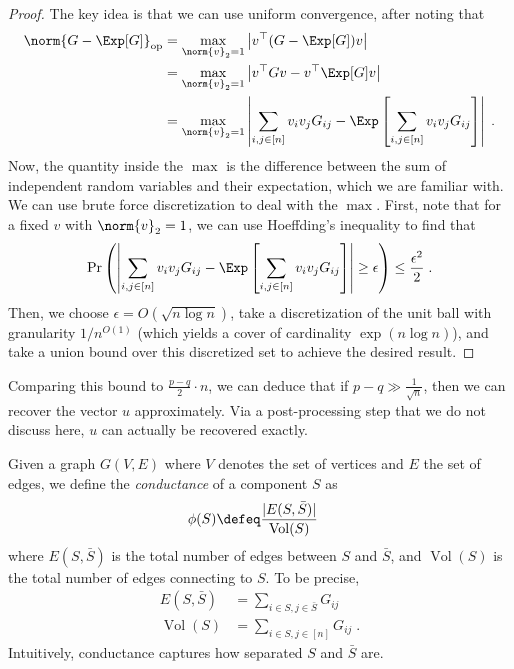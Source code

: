 \begin{proof}
The key idea is that we can use uniform convergence, after noting that
\begin{align}
    \norm{ G - \Exp[G] }_{\mathrm{op}} &= \max_{\norm{ v }_2 = 1} \left\vert v^\top (G - \Exp[G]) v \right\vert \\
    &= \max_{\norm{ v }_2 = 1} \left\vert v^\top G v - v^\top \Exp[G] v \right\vert \\
    &= \max_{\norm{ v }_2 = 1} \left\vert \sum_{i, j \in [n]} v_i v_j G_{ij} - \Exp \left[ \sum_{i, j \in [n]} v_i v_j G_{ij} \right] \right\vert \;.
\end{align}
Now, the quantity inside the $\max$ is the difference between the sum of independent random variables and their expectation, which we are familiar with. We can use brute force discretization to deal with the $\max$. First, note that for a fixed $v$ with $\norm{ v }_2 = 1$, we can use Hoeffding's inequality to find that
\begin{align}
    \Pr \left( \left\vert \sum_{i, j \in [n]} v_i v_j G_{ij} - \Exp \left[ \sum_{i, j \in [n]} v_i v_j G_{ij} \right] \right\vert \geq \epsilon \right) \leq \frac{\epsilon^2}{2} \;.
\end{align}
Then, we choose $\epsilon = O(\sqrt{n \log n})$, take a discretization of the unit ball with granularity $1/n^{O(1)}$ (which yields a cover of cardinality  $\exp(n \log n)$), and take a union bound over this discretized set to achieve the desired result.
\end{proof}

\begin{remark}
Comparing this bound to $\frac{p - q}{2} \cdot n$, we can deduce that if $p - q \gg \frac{1}{\sqrt{n}}$, then we can recover the vector $u$ approximately. Via a post-processing step that we do not discuss here, $u$ can actually be recovered exactly.
\end{remark}


Given a graph $G(V, E)$ where $V$ denotes the set of vertices and $E$ the set of edges, we define the {\it conductance} of a component $S$ as
\begin{align}
    \phi(S) &\defeq \frac{\vert E(S, \bar{S}) \vert}{\operatorname{Vol}(S)}
\end{align}
where $E(S, \bar{S})$ is the total number of edges between $S$ and $\bar{S}$, and $\operatorname{Vol}(S)$ is the total number of edges connecting to $S$. To be precise,
\begin{align}
    E(S, \bar{S}) &= \sum_{i \in S, j \in \bar{S}} G_{ij} \\
    \operatorname{Vol}(S) &= \sum_{i \in S, j \in [n]} G_{ij} \;.
\end{align}
Intuitively, conductance captures how separated $S$ and $\bar{S}$ are. 


